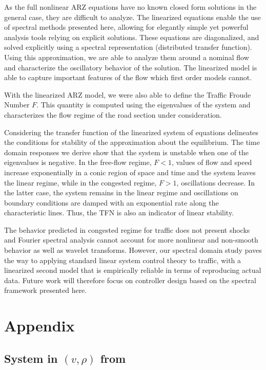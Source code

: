 \documentclass[a4paper, 10pt, conference]{ieeeconf}      %
\begin{document}
As the full nonlinear ARZ equations have no known closed form solutions in the general case, they are difficult to analyze. The linearized equations enable the use of spectral methods presented here, allowing for elegantly simple yet powerful analysis tools relying on explicit solutions. These equations are diagonalized, and solved explicitly using a spectral representation (distributed transfer function). Using this approximation, we are able to analyze them around a nominal flow and characterize the oscillatory behavior of the solution. The linearized model is able to capture important features of the flow which first order models cannot. 

With the linearized ARZ model, we were also able to define the Traffic Froude Number $F$. This quantity is computed using the eigenvalues of the system and characterizes the flow regime of the road section under consideration. 

Considering the transfer function of the linearized system of equations delineates the conditions for stability of the approximation about the equilibrium. The time domain responses we derive show that the system is unstable when one of the eigenvalues is negative. In the free-flow regime, $F < 1$, values of flow and speed increase exponentially in a conic region of space and time and the system leaves the linear regime, while in the congested regime, $F>1$, oscillations decrease. In the latter case, the system remains in the linear regime and oscillations on boundary conditions are damped with an exponential rate along the characteristic lines. Thus, the TFN is also an indicator of linear stability.

The behavior predicted in congested regime for traffic does not present shocks and Fourier spectral analysis cannot account for more nonlinear and non-smooth behavior as well as wavelet transforms. However, our spectral domain study paves the way to applying standard linear system control theory to traffic, with a linearized second model that is empirically reliable in terms of reproducing actual data. Future work will therefore focus on controller design based on the spectral framework presented here.



\newpage
\section*{Appendix}

\subsection{System in $(v, \rho)$ from}
\end{document}
